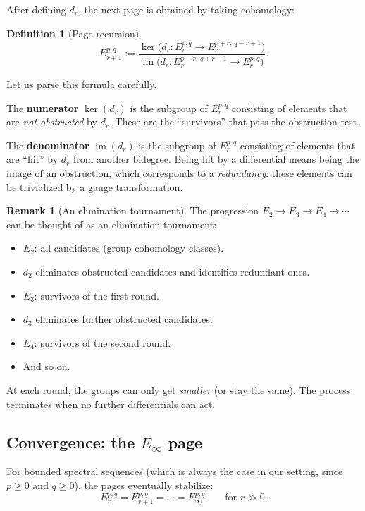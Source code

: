 \documentclass{SciPost}
\theoremstyle{definition}
\newtheorem{definition}[theorem]{Definition}
\newtheorem{remark}[theorem]{Remark}
\renewcommand{\im}{\operatorname{im}}
\begin{document}
After defining $d_r$, the next page is obtained by taking cohomology:

\begin{definition}[Page recursion]
\begin{equation}
\label{eq:page-recursion}
E_{r+1}^{p,q} := \frac{\ker\bigl(d_r: E_r^{p,q} \to E_r^{p+r,\, q-r+1}\bigr)}{\im\bigl(d_r: E_r^{p-r,\, q+r-1} \to E_r^{p,q}\bigr)}.
\end{equation}
\end{definition}

Let us parse this formula carefully.

The \textbf{numerator} $\ker(d_r)$ is the subgroup of $E_r^{p,q}$ consisting of elements that are \emph{not obstructed} by $d_r$.
These are the ``survivors'' that pass the obstruction test.

The \textbf{denominator} $\im(d_r)$ is the subgroup of $E_r^{p,q}$ consisting of elements that are ``hit'' by $d_r$ from another bidegree.
Being hit by a differential means being the image of an obstruction, which corresponds to a \emph{redundancy}: these elements can be trivialized by a gauge transformation.

\begin{remark}[An elimination tournament]
The progression $E_2 \to E_3 \to E_4 \to \cdots$ can be thought of as an elimination tournament:
\begin{itemize}
    \item $E_2$: all candidates (group cohomology classes).
    \item $d_2$ eliminates obstructed candidates and identifies redundant ones.
    \item $E_3$: survivors of the first round.
    \item $d_3$ eliminates further obstructed candidates.
    \item $E_4$: survivors of the second round.
    \item And so on.
\end{itemize}
At each round, the groups can only get \emph{smaller} (or stay the same).
The process terminates when no further differentials can act.
\end{remark}

\subsection{Convergence: the $E_\infty$ page}
\label{subsec:convergence}

For bounded spectral sequences (which is always the case in our setting, since $p \geq 0$ and $q \geq 0$), the pages eventually stabilize:
\begin{equation}
\label{eq:stabilization}
E_r^{p,q} = E_{r+1}^{p,q} = \cdots = E_\infty^{p,q} \qquad \text{for } r \gg 0.
\end{equation}
\end{document}
